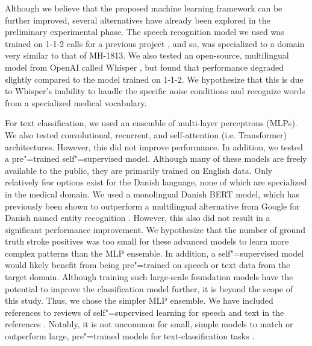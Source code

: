 {Although we believe that the proposed machine learning framework can be further improved, several alternatives have already been explored in the preliminary experimental phase. The speech recognition model we used was trained on 1-1-2 calls for a previous project \parencite{cite14}, and so, was specialized to a domain very similar to that of MH-1813. We also tested an open-source, multilingual model from OpenAI called Whisper \parencite{radford_robust_2023}, but found that performance degraded slightly compared to the model trained on 1-1-2. We hypothesize that this is due to Whisper's inability to handle the specific noise conditions and recognize words from a specialized medical vocabulary.

For text classification, we used an ensemble of multi-layer perceptrons (MLPs). We also tested convolutional, recurrent, and self-attention (i.e. Transformer) architectures. However, this did not improve performance. In addition, we tested a pre"=trained self"=supervised model. Although many of these models are freely available to the public, they are primarily trained on English data. Only relatively few options exist for the Danish language, none of which are specialized in the medical domain. We used a monolingual Danish BERT model, which has previously been shown to outperform a multilingual alternative from Google for Danish named entity recognition \parencite{hvingelby_dane_2020}. However, this also did not result in a significant performance improvement. We hypothesize that the number of ground truth stroke positives was too small for these advanced models to learn more complex patterns than the MLP ensemble. In addition, a self"=supervised model would likely benefit from being pre"=trained on speech or text data from the target domain. Although training such large-scale foundation models have the potential to improve the classification model further, it is beyond the scope of this study. Thus, we chose the simpler MLP ensemble. We have included references to reviews of self"=supervised learning for speech and text in the references \parencite{gururangan_don_2020,mohamed_selfsupervised_2022}. Notably, it is not uncommon for small, simple models to match or outperform large, pre"=trained models for text-classification tasks \parencite{galke_bagofwords_2022}.

}
